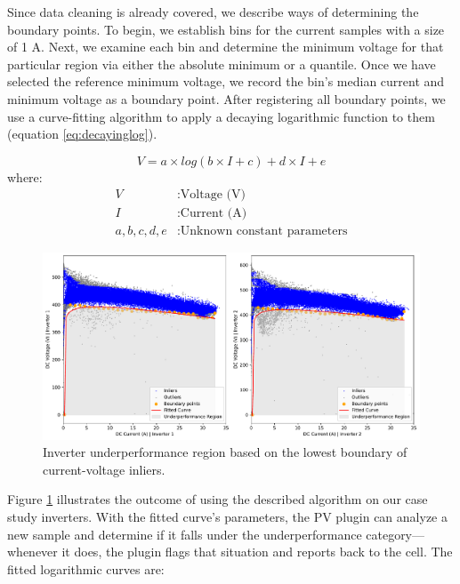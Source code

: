 Since data cleaning is already covered, we describe ways of determining the boundary points.
To begin, we establish bins for the current samples with a size of 1 A. Next, we examine each bin and determine the minimum voltage for that particular region via either the absolute minimum or a quantile. Once we have selected the reference minimum voltage, we record the bin's median current and minimum voltage as a boundary point.
After registering all boundary points, we use a curve-fitting algorithm to apply a decaying logarithmic function to them (equation \ref{eq:decayinglog}).

\begin{equation} \label{eq:decayinglog}
    V = a \times log(b \times I + c) + d \times I + e 
\end{equation}
where:
\begin{align*}
    V & : \text{Voltage (V)} \\
    I & : \text{Current (A)} \\
    a,b,c,d,e & : \text{Unknown constant parameters}
\end{align*}

\begin{figure}[h!]
    \centering
    \includegraphics[width=\textwidth]{figures/chapter5/algorithm/30_boundary.pdf}
    \caption{Inverter underperformance region based on the lowest boundary of current-voltage inliers.}
    \label{fig:anomaly_decision_boundary}
\end{figure}

Figure \ref{fig:anomaly_decision_boundary} illustrates the outcome of using the described algorithm on our case study inverters. With the fitted curve's parameters, the PV plugin can analyze a new sample and determine if it falls under the underperformance category—whenever it does, the plugin flags that situation and reports back to the cell.
The fitted logarithmic curves are:

